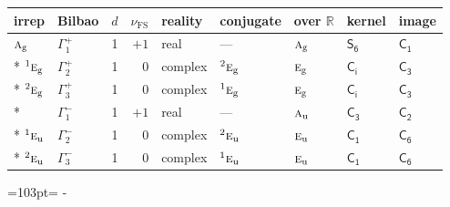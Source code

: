 \documentclass[10pt,a4paper]{article}
\newcommand{\needspace}[1]{\par\penalty-100\begingroup\dimen0=#1\relax\dimen2=\pagegoal
  \advance\dimen2-\pagetotal\ifdim\dimen0>\dimen2\relax\ifdim\dimen2>0pt\vfil\break\fi\fi
  \endgroup}
\numberwithin{equation}{section}
\newcommand{\grp}[1]{\mathsf{#1}}
\newcommand{\irr}[1]{\text{\normalfont\scshape #1}}
\newcommand{\conjpair}[1]{{}^{#1}}
\newcommand{\detbox}[1]{{\setlength{\fboxsep}{1pt}\fbox{#1}}}
\newcommand{\ptag}[1]{\mathrm{#1}}
\newcommand{\fsind}{\nu_{\mathrm{FS}}}
\begin{document}
{\small\renewcommand{\arraystretch}{1.25}\setlength{\tabcolsep}{4pt}\begin{longtable}{@{}llrrlllll@{}}\toprule
irrep & Bilbao & $d$ & $\fsind$ & reality & conjugate & over $\mathbb{R}$ & kernel & image\\\midrule\endhead
\bottomrule\endfoot\endlastfoot
$\irr{a}_{\ptag{g}}$ & $\Gamma_{1}^{+}$ & 1 & $+1$ & real & --- & $\irr{a}_{\ptag{g}}$ & \href{S6.pdf}{$\grp{S_{6}}$} & \href{C1.pdf}{$\grp{C_{1}}$}\\*
$\conjpair{1}\irr{e}_{\ptag{g}}$ & $\Gamma_{2}^{+}$ & 1 & $0$ & complex & $\conjpair{2}\irr{e}_{\ptag{g}}$ & $\irr{e}_{\ptag{g}}$ & \href{S2.pdf}{$\grp{C_{i}}$} & \href{C3.pdf}{$\grp{C_{3}}$}\\*
$\conjpair{2}\irr{e}_{\ptag{g}}$ & $\Gamma_{3}^{+}$ & 1 & $0$ & complex & $\conjpair{1}\irr{e}_{\ptag{g}}$ & $\irr{e}_{\ptag{g}}$ & \href{S2.pdf}{$\grp{C_{i}}$} & \href{C3.pdf}{$\grp{C_{3}}$}\\*
\detbox{$\irr{a}_{\ptag{u}}$} & $\Gamma_{1}^{-}$ & 1 & $+1$ & real & --- & $\irr{a}_{\ptag{u}}$ & \href{C3.pdf}{$\grp{C_{3}}$} & \href{C2.pdf}{$\grp{C_{2}}$}\\*
$\conjpair{1}\irr{e}_{\ptag{u}}$ & $\Gamma_{2}^{-}$ & 1 & $0$ & complex & $\conjpair{2}\irr{e}_{\ptag{u}}$ & $\irr{e}_{\ptag{u}}$ & \href{C1.pdf}{$\grp{C_{1}}$} & \href{C6.pdf}{$\grp{C_{6}}$}\\*
$\conjpair{2}\irr{e}_{\ptag{u}}$ & $\Gamma_{3}^{-}$ & 1 & $0$ & complex & $\conjpair{1}\irr{e}_{\ptag{u}}$ & $\irr{e}_{\ptag{u}}$ & \href{C1.pdf}{$\grp{C_{1}}$} & \href{C6.pdf}{$\grp{C_{6}}$}\\
\bottomrule\end{longtable}}
\needspace{103pt}
\end{document}
